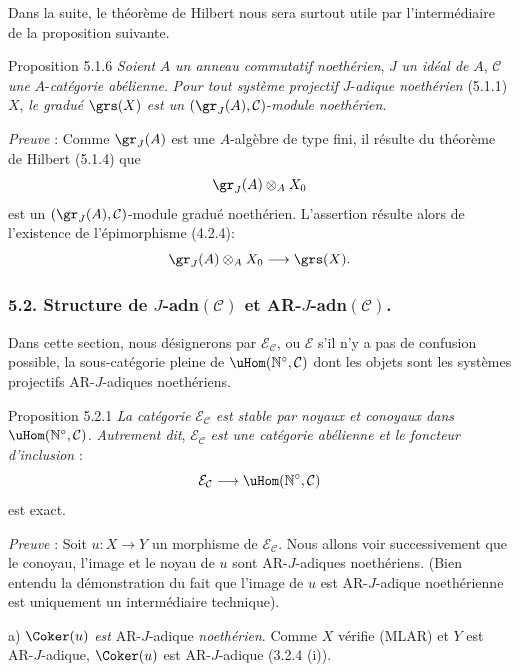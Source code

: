 Dans la suite, le théorème de Hilbert nous sera surtout utile par l'intermédiaire de la proposition suivante.

\begin{statement}{Proposition 5.1.6}
\emph{Soient} \(A\) \emph{un anneau commutatif noethérien}, \(J\) \emph{un idéal de} \(A\), \(\mathcal{C}\) \emph{une} \(A\)-\emph{catégorie abélienne}. \emph{Pour tout système projectif} \(J\)-\emph{adique noethérien} (5.1.1) \(X\), \emph{le gradué} \(\grs(X)\) \emph{est un} \((\gr_J(A),\mathcal{C})\)-\emph{module noethérien}.
\end{statement}

\emph{Preuve} : Comme \(\gr_J(A)\) est une \(A\)-algèbre de type fini, il résulte du théorème de Hilbert (5.1.4) que
\[
\gr_J(A)\otimes_A X_0
\]
est un \((\gr_J(A),\mathcal{C})\)-module gradué noethérien. L'assertion résulte alors de l'existence de l'épimorphisme (4.2.4):
\[
\gr_J(A)\otimes_A X_0\longrightarrow \grs(X).
\]

\subsubsection*{5.2. Structure de \(J\)-adn\((\mathcal{C})\) et AR-\(J\)-adn\((\mathcal{C})\).}

Dans cette section, nous désignerons par \(\mathcal{E}_{\mathcal{C}}\), ou \(\mathcal{E}\) s'il n'y a pas de confusion possible, la sous-catégorie pleine de \(\uHom(\mathbb{N}^\circ,\mathcal{C})\) dont les objets sont les systèmes projectifs AR-\(J\)-adiques noethériens.

\begin{statement}{Proposition 5.2.1}
\emph{La catégorie} \(\mathcal{E}_{\mathcal{C}}\) \emph{est stable par noyaux et conoyaux dans} \(\uHom(\mathbb{N}^\circ,\mathcal{C})\). \emph{Autrement dit}, \(\mathcal{E}_{\mathcal{C}}\) \emph{est une catégorie abélienne et le foncteur} \emph{d'inclusion} :
\[
\mathcal{E}_{\mathcal{C}}\longrightarrow \uHom(\mathbb{N}^\circ,\mathcal{C})
\]
est exact.
\end{statement}

\emph{Preuve} :
Soit \(u:X\to Y\) un morphisme de \(\mathcal{E}_{\mathcal{C}}\). Nous allons voir successivement que le conoyau, l'image et le noyau de \(u\) sont AR-\(J\)-adiques noethériens. (Bien entendu la démonstration du fait que l'image de \(u\) est AR-\(J\)-adique noethérienne est uniquement un intermédiaire technique).

a) \(\Coker(u)\) \emph{est} AR-\(J\)-adique \emph{noethérien}. Comme \(X\) vérifie (MLAR) et \(Y\) est AR-\(J\)-adique, \(\Coker(u)\) est AR-\(J\)-adique (3.2.4 (i)).

